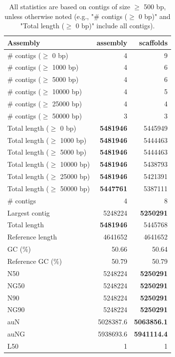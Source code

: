 \documentclass[12pt,a4paper]{article}
\begin{document}
\begin{table}[ht]
\begin{center}
\caption{All statistics are based on contigs of size $\geq$ 500 bp, unless otherwise noted (e.g., "\# contigs ($\geq$ 0 bp)" and "Total length ($\geq$ 0 bp)" include all contigs).}
\begin{tabular}{|l*{2}{|r}|}
\hline
Assembly & assembly & scaffolds \\ \hline
\# contigs ($\geq$ 0 bp) & 4 & 9 \\ \hline
\# contigs ($\geq$ 1000 bp) & 4 & 6 \\ \hline
\# contigs ($\geq$ 5000 bp) & 4 & 6 \\ \hline
\# contigs ($\geq$ 10000 bp) & 4 & 5 \\ \hline
\# contigs ($\geq$ 25000 bp) & 4 & 4 \\ \hline
\# contigs ($\geq$ 50000 bp) & 3 & 3 \\ \hline
Total length ($\geq$ 0 bp) & {\bf 5481946} & 5445949 \\ \hline
Total length ($\geq$ 1000 bp) & {\bf 5481946} & 5444463 \\ \hline
Total length ($\geq$ 5000 bp) & {\bf 5481946} & 5444463 \\ \hline
Total length ($\geq$ 10000 bp) & {\bf 5481946} & 5438793 \\ \hline
Total length ($\geq$ 25000 bp) & {\bf 5481946} & 5421391 \\ \hline
Total length ($\geq$ 50000 bp) & {\bf 5447761} & 5387111 \\ \hline
\# contigs & 4 & 8 \\ \hline
Largest contig & 5248224 & {\bf 5250291} \\ \hline
Total length & {\bf 5481946} & 5445768 \\ \hline
Reference length & 4641652 & 4641652 \\ \hline
GC (\%) & 50.66 & 50.64 \\ \hline
Reference GC (\%) & 50.79 & 50.79 \\ \hline
N50 & 5248224 & {\bf 5250291} \\ \hline
NG50 & 5248224 & {\bf 5250291} \\ \hline
N90 & 5248224 & {\bf 5250291} \\ \hline
NG90 & 5248224 & {\bf 5250291} \\ \hline
auN & 5028387.6 & {\bf 5063856.1} \\ \hline
auNG & 5938693.6 & {\bf 5941114.4} \\ \hline
L50 & 1 & 1 \\ \hline

\end{tabular}
\end{center}
\end{table}
\end{document}
